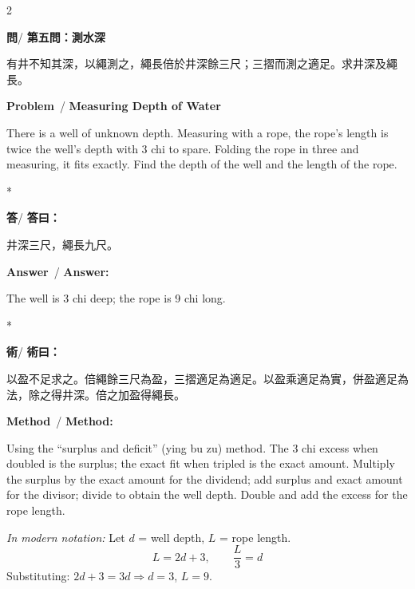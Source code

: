\documentclass[11pt,a4paper]{article}
\newcommand{\wen}{\textbf{\color{sectioncolor}問}}
\newcommand{\da}{\textbf{\color{answercolor}答}}
\newcommand{\shu}{\textbf{\color{methodcolor}術}}
\newcommand{\prb}{\textbf{\color{sectioncolor}Problem}}
\newcommand{\ans}{\textbf{\color{answercolor}Answer}}
\newcommand{\meth}{\textbf{\color{methodcolor}Method}}
\begin{document}
\begin{paracol}{2}

\begin{leftcolumn*}
\wen / \textbf{第五問：測水深}

有井不知其深，以繩測之，繩長倍於井深餘三尺；三摺而測之適足。求井深及繩長。
\end{leftcolumn*}

\begin{rightcolumn}
\prb\ / \textbf{Measuring Depth of Water}

There is a well of unknown depth. Measuring with a 
rope, the rope's length is twice the well's depth with 3 chi to spare. 
Folding the rope in three and measuring, it fits exactly. Find the depth 
of the well and the length of the rope.
\end{rightcolumn}

\switchcolumn[0]*

\begin{leftcolumn*}
\da / \textbf{答曰：}

井深三尺，繩長九尺。
\end{leftcolumn*}

\begin{rightcolumn}
\ans\ / \textbf{Answer:}

The well is 3 chi deep; the rope is 9 chi long.
\end{rightcolumn}

\switchcolumn[0]*

\begin{leftcolumn*}
\shu / \textbf{術曰：}

以盈不足求之。倍繩餘三尺為盈，三摺適足為適足。以盈乘適足為實，併盈適足為法，除之得井深。倍之加盈得繩長。
\end{leftcolumn*}

\begin{rightcolumn}
\meth\ / \textbf{Method:}

Using the ``surplus and deficit'' (ying bu zu) method. The 
3 chi excess when doubled is the surplus; the exact fit when tripled is 
the exact amount. Multiply the surplus by the exact amount for the 
dividend; add surplus and exact amount for the divisor; divide to obtain 
the well depth. Double and add the excess for the rope length.

\medskip
\textit{In modern notation:} Let $d$ = well depth, $L$ = rope length.
\[
L = 2d + 3, \qquad \frac{L}{3} = d
\]
Substituting: $2d + 3 = 3d \Rightarrow d = 3$, $L = 9$.
\end{rightcolumn}

\end{paracol}
\end{document}
